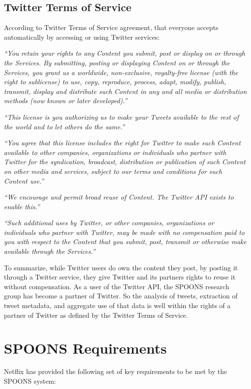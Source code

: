 \documentclass[12pt]{ucthesis}
\begin{document}
\subsection{Twitter Terms of Service}

According to Twitter Terms of Service\cite{termsOfService} agreement, that
everyone accepts automatically by accessing or using Twitter services:

\emph{``You retain your rights to any Content you submit, post or
display on or through the Services. By submitting, posting or displaying Content
on or through the Services, you grant us a worldwide, non-exclusive,
royalty-free license (with the right to sublicense) to use, copy, reproduce,
process, adapt, modify, publish, transmit, display and distribute such Content
in any and all media or distribution methods (now known or later developed).''}

\emph{``This license is you authorizing us to make your Tweets available to the
rest of the world and to let others do the same.''}

\emph{``You agree that this license includes the right for Twitter to make such
Content available to other companies, organizations or individuals who partner with
Twitter for the syndication, broadcast, distribution or publication of such
Content on other media and services, subject to our terms and conditions for
such Content use.''}

\emph{``We encourage and permit broad reuse of Content. The Twitter API exists to
enable this.''}

\emph{``Such additional uses by Twitter, or other companies, organizations or
individuals who partner with Twitter, may be made with no compensation paid to
you with respect to the Content that you submit, post, transmit or otherwise
make available through the Services.''}

To summarize, while Twitter users do own the content they post,
by posting it through a Twitter service, they give Twitter and its partners
rights to reuse it without compensation. As a user of the Twitter API, the
SPOONS research group has become a partner of Twitter. So the analysis of
tweets, extraction of tweet metadata, and aggregate use of that data is well
within the rights of a partner of Twitter as defined by the Twitter Terms of
Service.

\section{SPOONS Requirements}
Netflix has provided the following set of key requirements to be met by the
SPOONS system:
\end{document}
